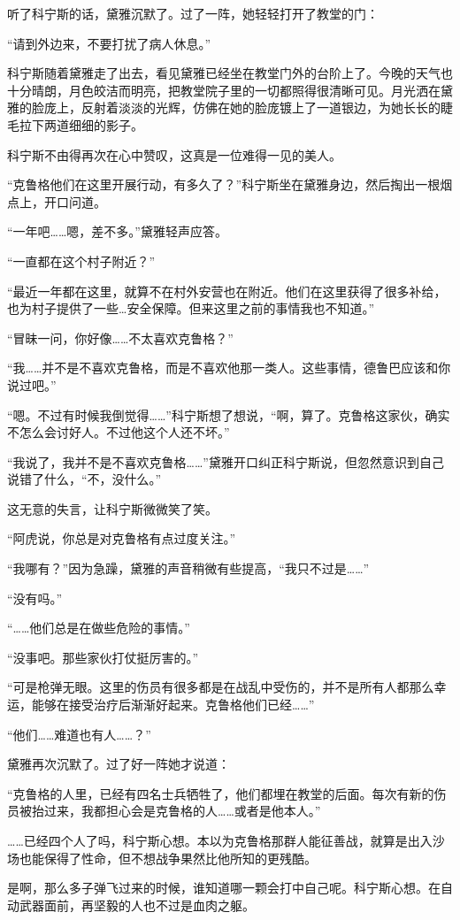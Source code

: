 听了科宁斯的话，黛雅沉默了。过了一阵，她轻轻打开了教堂的门：

“请到外边来，不要打扰了病人休息。”

科宁斯随着黛雅走了出去，看见黛雅已经坐在教堂门外的台阶上了。今晚的天气也十分晴朗，月色皎洁而明亮，把教堂院子里的一切都照得很清晰可见。月光洒在黛雅的脸庞上，反射着淡淡的光辉，仿佛在她的脸庞镀上了一道银边，为她长长的睫毛拉下两道细细的影子。

科宁斯不由得再次在心中赞叹，这真是一位难得一见的美人。

“克鲁格他们在这里开展行动，有多久了？”科宁斯坐在黛雅身边，然后掏出一根烟点上，开口问道。

“一年吧……嗯，差不多。”黛雅轻声应答。

“一直都在这个村子附近？”

“最近一年都在这里，就算不在村外安营也在附近。他们在这里获得了很多补给，也为村子提供了一些…安全保障。但来这里之前的事情我也不知道。”

“冒昧一问，你好像……不太喜欢克鲁格？”

“我……并不是不喜欢克鲁格，而是不喜欢他那一类人。这些事情，德鲁巴应该和你说过吧。”

“嗯。不过有时候我倒觉得……”科宁斯想了想说，“啊，算了。克鲁格这家伙，确实不怎么会讨好人。不过他这个人还不坏。”

“我说了，我并不是不喜欢克鲁格……”黛雅开口纠正科宁斯说，但忽然意识到自己说错了什么，“不，没什么。”

这无意的失言，让科宁斯微微笑了笑。

“阿虎说，你总是对克鲁格有点过度关注。”

“我哪有？”因为急躁，黛雅的声音稍微有些提高，“我只不过是……”

“没有吗。”

“……他们总是在做些危险的事情。”

“没事吧。那些家伙打仗挺厉害的。”

“可是枪弹无眼。这里的伤员有很多都是在战乱中受伤的，并不是所有人都那么幸运，能够在接受治疗后渐渐好起来。克鲁格他们已经……”

“他们……难道也有人……？”

黛雅再次沉默了。过了好一阵她才说道：

“克鲁格的人里，已经有四名士兵牺牲了，他们都埋在教堂的后面。每次有新的伤员被抬过来，我都担心会是克鲁格的人……或者是他本人。”

……已经四个人了吗，科宁斯心想。本以为克鲁格那群人能征善战，就算是出入沙场也能保得了性命，但不想战争果然比他所知的更残酷。

是啊，那么多子弹飞过来的时候，谁知道哪一颗会打中自己呢。科宁斯心想。在自动武器面前，再坚毅的人也不过是血肉之躯。


